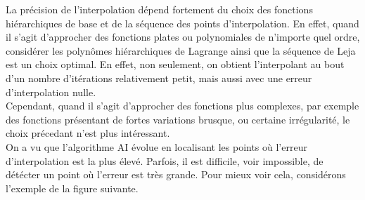 La précision de l'interpolation dépend fortement du choix des fonctions hiérarchiques de base et de la séquence des points d'interpolation.
En effet, quand il s'agit d'approcher des fonctions plates ou polynomiales de n'importe quel ordre, considérer les polynômes hiérarchiques de Lagrange ainsi que la séquence de Leja est un
choix optimal. En effet, non seulement, on obtient l'interpolant au bout d'un nombre d'itérations relativement petit, mais aussi avec une erreur d'interpolation nulle. \\
Cependant, quand il s'agit d'approcher des fonctions plus complexes, par exemple des fonctions présentant de fortes variations brusque, ou certaine irrégularité, le choix précedant n'est
plus intéressant.\\
On a vu que l'algorithme AI évolue en localisant les points où l'erreur d'interpolation est la plus élevé. Parfois, il est difficile, voir impossible, de détécter
un point où l'erreur est très grande. Pour mieux voir cela, considérons l'exemple de la figure suivante.

%

